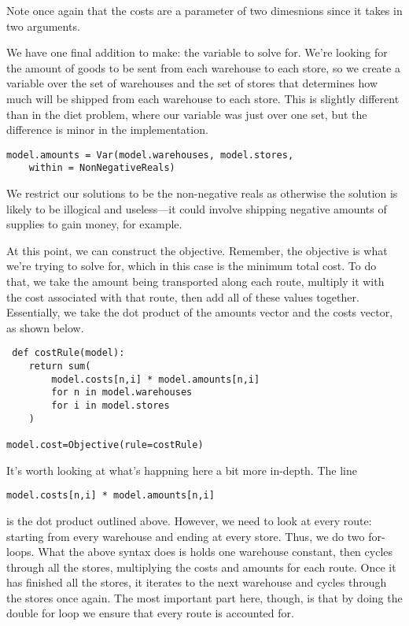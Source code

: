 \documentclass{article}
\begin{document}
\noindent
Note once again that the costs are a parameter of two dimesnions since it takes in two arguments.  

We have one final addition to make: the variable to solve for.  We're looking for the amount of goods to be sent from each warehouse to each store, so we create a variable over the set of warehouses and the set of stores that determines how much will be shipped from each warehouse to each store.  This is slightly different than in the diet problem, where our variable was just over one set, but the difference is minor in the implementation.

\begin{verbatim}
model.amounts = Var(model.warehouses, model.stores, 
    within = NonNegativeReals)
\end{verbatim}

\noindent
We restrict our solutions to be the non-negative reals as otherwise the solution is likely to be illogical and useless---it could involve shipping negative amounts of supplies to gain money, for example.

At this point, we can construct the objective.  Remember, the objective is what we're trying to solve for, which in this case is the minimum total cost.  To do that, we take the amount being transported along each route, multiply it with the cost associated with that route, then add all of these values together.  Essentially, we take the dot product of the amounts vector and the costs vector, as shown below.

\begin{verbatim}
 def costRule(model):
    return sum(
        model.costs[n,i] * model.amounts[n,i]
        for n in model.warehouses
        for i in model.stores
    )

model.cost=Objective(rule=costRule)
\end{verbatim}

\noindent
It's worth looking at what's happning here a bit more in-depth.  The line \begin{verbatim}model.costs[n,i] * model.amounts[n,i] \end{verbatim} is the dot product outlined above.  However, we need to look at every route: starting from every warehouse and ending at every store.  Thus, we do two for-loops.  What the above syntax does is holds one warehouse constant, then cycles through all the stores, multiplying the costs and amounts for each route.  Once it has finished all the stores, it iterates to the next warehouse and cycles through the stores once again.  The most important part here, though, is that by doing the double for loop we ensure that every route is accounted for.
\end{document}
